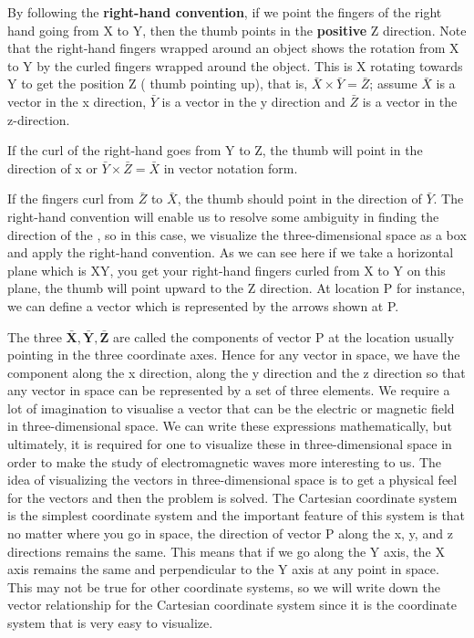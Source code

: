 By following the \textbf{right-hand convention}, if we point the fingers of the right hand going from X to Y, then the thumb points in the \textbf{positive} Z direction. Note that the right-hand fingers wrapped around an object shows the rotation from X to Y by the curled fingers wrapped around the object. This is X rotating towards Y to get the position Z ( thumb pointing up), that is, $\bar{X} \times \bar{Y} = \bar{Z}$; assume  $\bar{X}$ is a vector in the x direction, $\bar{Y}$ is a vector in the y direction and $\bar{Z}$ is a vector in the z-direction.

If the curl of the right-hand goes from Y to Z, the thumb will point in the direction of x or $\bar{Y} \times \bar{Z} = \bar{X}$ in vector notation form.

If the fingers curl from $\bar{Z}$ to $\bar{X}$, the thumb should point in the direction of $\bar{Y}$. The right-hand convention will enable us to resolve some ambiguity in finding the direction of the , so in this case, we visualize the three-dimensional space as a box and apply the right-hand convention. As we can see here if we take a horizontal plane which is XY, you get your right-hand fingers curled from X to Y on this plane, the thumb will point upward to the Z direction. At location P for instance, we can define a vector which is represented by the arrows shown at P.

The three  $\mathbf{\bar{X}, \bar{Y}, \bar{Z}}$ are called the components of vector P at the location usually pointing in the three coordinate axes. Hence for any vector in space, we have the component along the x direction, along the y direction and the z direction so that any vector in space can be represented by a set of three elements. We require a lot of imagination to visualise a vector that can be the electric or magnetic field in three-dimensional space. We can write these expressions mathematically, but ultimately, it is required for one to visualize these in three-dimensional space in order to make the study of electromagnetic waves more interesting to us. The idea of visualizing the vectors in three-dimensional space is to get a physical feel for the vectors and then the problem is solved. The Cartesian coordinate system is the simplest coordinate system and the important feature of this system is that no matter where you go in space, the direction of vector P along the x, y, and z directions remains the same. This means that if we go along the Y axis, the X axis remains the same and perpendicular to the Y axis at any point in space. This may not be true for other coordinate systems, so we will write down the vector relationship for the Cartesian coordinate system since it is the coordinate system that is very easy to visualize. 

